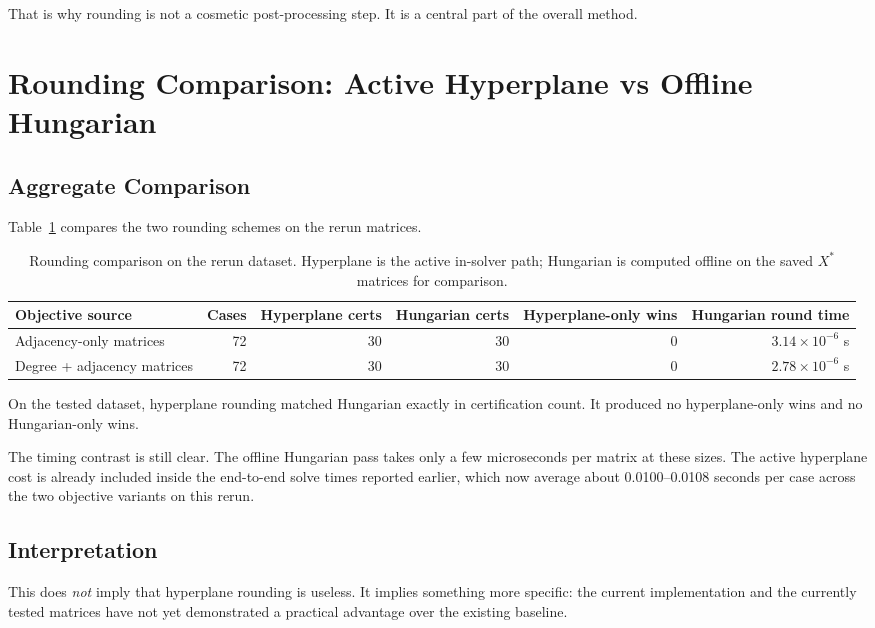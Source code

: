 \documentclass[11pt]{article}
\begin{document}
That is why rounding is not a cosmetic post-processing step.
It is a central part of the overall method.

\section{Rounding Comparison: Active Hyperplane vs Offline Hungarian}

\subsection{Aggregate Comparison}

Table~\ref{tab:rounding} compares the two rounding schemes on the rerun matrices.

\begin{table}[h]
\centering
\caption{Rounding comparison on the rerun dataset. Hyperplane is the active in-solver path; Hungarian is computed offline on the saved $X^*$ matrices for comparison.}
\label{tab:rounding}
\begin{tabular}{>{\raggedright\arraybackslash}p{4.0cm} r r r r r}
\toprule
Objective source & Cases & Hyperplane certs & Hungarian certs & Hyperplane-only wins & Hungarian round time \\
\midrule
Adjacency-only matrices & 72 & 30 & 30 & 0 & $3.14 \times 10^{-6}$ s \\
\addlinespace
Degree + adjacency matrices & 72 & 30 & 30 & 0 & $2.78 \times 10^{-6}$ s \\
\bottomrule
\end{tabular}
\end{table}

On the tested dataset, hyperplane rounding matched Hungarian exactly in certification count.
It produced no hyperplane-only wins and no Hungarian-only wins.

The timing contrast is still clear.
The offline Hungarian pass takes only a few microseconds per matrix at these sizes.
The active hyperplane cost is already included inside the end-to-end solve times reported earlier, which now average about 0.0100--0.0108 seconds per case across the two objective variants on this rerun.

\subsection{Interpretation}

This does \emph{not} imply that hyperplane rounding is useless.
It implies something more specific:
the current implementation and the currently tested matrices have not yet demonstrated a practical advantage over the existing baseline.
\end{document}
